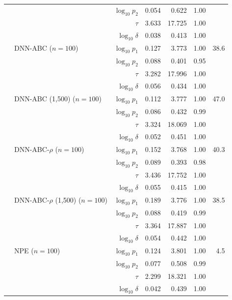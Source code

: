 \begin{tabular}{llrrrrr}
 &  & $\log_{10}p_2$ & 0.054 & 0.622 & 1.00 &  \\
 &  & $\tau$ & 3.633 & 17.725 & 1.00 &  \\
 &  & $\log_{10}\delta$ & 0.038 & 0.413 & 1.00 &  \\
 & DNN-ABC ($n=100$) & $\log_{10}p_1$ & 0.127 & 3.773 & 1.00 & 38.6 \\
 &  & $\log_{10}p_2$ & 0.088 & 0.401 & 0.95 &  \\
 &  & $\tau$ & 3.282 & 17.996 & 1.00 &  \\
 &  & $\log_{10}\delta$ & 0.056 & 0.434 & 1.00 &  \\
 & DNN-ABC (1,500) ($n=100$) & $\log_{10}p_1$ & 0.112 & 3.777 & 1.00 & 47.0 \\
 &  & $\log_{10}p_2$ & 0.086 & 0.432 & 0.99 &  \\
 &  & $\tau$ & 3.324 & 18.069 & 1.00 &  \\
 &  & $\log_{10}\delta$ & 0.052 & 0.451 & 1.00 &  \\
 & DNN-ABC-$\rho$ ($n=100$) & $\log_{10}p_1$ & 0.152 & 3.768 & 1.00 & 40.3 \\
 &  & $\log_{10}p_2$ & 0.089 & 0.393 & 0.98 &  \\
 &  & $\tau$ & 3.436 & 17.752 & 1.00 &  \\
 &  & $\log_{10}\delta$ & 0.055 & 0.415 & 1.00 &  \\
 & DNN-ABC-$\rho$ (1,500) ($n=100$) & $\log_{10}p_1$ & 0.189 & 3.776 & 1.00 & 38.5 \\
 &  & $\log_{10}p_2$ & 0.088 & 0.419 & 0.99 &  \\
 &  & $\tau$ & 3.364 & 17.887 & 1.00 &  \\
 &  & $\log_{10}\delta$ & 0.054 & 0.442 & 1.00 &  \\
 & NPE ($n=100$) & $\log_{10}p_1$ & 0.124 & 3.801 & 1.00 & 4.5 \\
 &  & $\log_{10}p_2$ & 0.077 & 0.508 & 0.99 &  \\
 &  & $\tau$ & 2.299 & 18.321 & 1.00 &  \\
 &  & $\log_{10}\delta$ & 0.042 & 0.439 & 1.00 &  \\
\bottomrule
\end{tabular}
